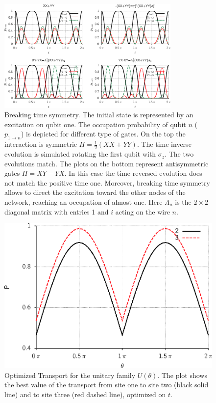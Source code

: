 \documentclass[aps,pra,12pt,nofootinbib,superscriptaddress,longbibliography,showpacs]{revtex4-1}
\theoremstyle{plain}
\theoremstyle{definition}
\begin{document}
\begin{figure}[p]
  \centering
  \includegraphics[width=0.8\textwidth]{3qbit_001}
  \caption{Breaking time symmetry.
  The initial state is represented by an excitation on qubit one. The
  occupation probability of qubit $n$ ($p_{1\to n}$) is depicted for different
  type of gates.
  On the top the interaction is symmetric $H=\frac 12 (XX+YY)$. The time inverse
  evolution is simulated rotating the first qubit with $\sigma_z$. The two
  evolutions match.
  The plots on the bottom represent antisymmetric gates $H=XY-YX$. In this
  case the time reversed evolution does not match the positive time one.
  Moreover, breaking time symmetry allows to direct the excitation
  toward the other nodes of the network, reaching an occupation of almost one.
  Here $\Lambda_n$ is the $2\times2$ diagonal matrix with entries 1 and $i$
  acting on the wire $n$.
  }
  \label{fig:init1}
\end{figure}



\begin{figure}[p]
	\begin{center}
		\includegraphics{opt-time}
	\end{center}
	\caption{Optimized Transport for the unitary family $U(\theta)$.
	The plot shows the best value of the transport from site one to site two
	(black solid line) and to site three (red dashed line), optimized on $t$.}
	\label{fig:opt}
\end{figure}
\end{document}

